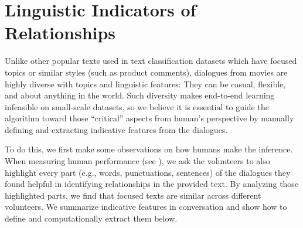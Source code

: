 %
\section{Linguistic Indicators of Relationships}
\label{sec:method}
 
Unlike other popular texts used in text classification datasets which 
have focused topics or similar styles (such as product comments), 
dialogues from movies are highly diverse with topics and linguistic
features: They can be casual, flexible, and about anything in the world.
Such diversity makes end-to-end learning 
infeasible on small-scale datasets, so we believe 
it is essential to guide the algorithm toward those ``critical'' 
aspects from human's perspective by manually defining and extracting 
indicative features from the dialogues.

To do this, we first make some observations on how humans make the inference. 
When measuring human performance (see ), 
we ask the volunteers to also highlight every part 
(e.g., words, punctuations, sentences) of the dialogues they found 
helpful in identifying relationships in the provided text. 
By analyzing those highlighted parts, 
we find that focused texts are similar across different volunteers. 
We summarize indicative features in conversation and show how to define and 
computationally extract them below.  

